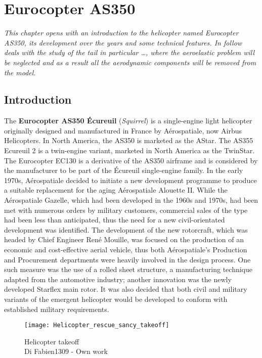\chapter{Eurocopter AS350}
\label{ch:Eurocopter AS350}

\emph{This chapter opens with an introduction to the helicopter named Eurocopter AS350, its development over the years and some technical features. In follow deals with the study of the tail in particular \dots, where the aeroelastic problem will be neglected and as a result all the aerodynamic components will be removed from the model.}

\section{Introduction}
The \textbf{Eurocopter AS350 Écureuil} (\emph{Squirrel}) is a single-engine light helicopter originally designed and manufactured in France by Aérospatiale, now Airbus Helicopters. In North America, the AS350 is marketed as the AStar. The AS355 Ecureuil 2 is a twin-engine variant, marketed in North America as the TwinStar. The Eurocopter EC130 is a derivative of the AS350 airframe and is considered by the manufacturer to be part of the Écureuil single-engine family.
In the early 1970s, Aérospatiale decided to initiate a new development programme to produce a suitable replacement for the aging Aérospatiale Alouette II.
While the Aérospatiale Gazelle, which had been developed in the 1960s and 1970s, had been met with numerous orders by military customers, commercial sales of the type had been less than anticipated, thus the need for a new civil-orientated development was identified.
The development of the new rotorcraft, which was headed by Chief Engineer René Mouille, was focused on the production of an economic and cost-effective aerial vehicle, thus both Aérospatiale's Production and Procurement departments were heavily involved in the design process.
One such measure was the use of a rolled sheet structure, a manufacturing technique adapted from the automotive industry; another innovation was the newly developed Starflex main rotor. It was also decided that both civil and military variants of the emergent helicopter would be developed to conform with established military requirements\cite{wiki:xxx}.

\begin{figure}[t]
\centering
\texttt{[image: Helicopter\_rescue\_sancy\_takeoff]}
\caption{Helicopter takeoff \\Di Fabien1309 - Own work}
\label{fig:AS350wiki}
\end{figure}

